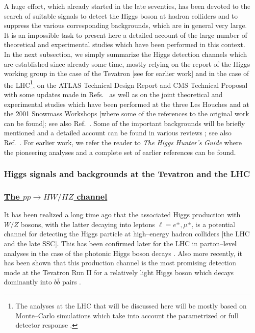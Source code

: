A huge effort, which already started in the late seventies, has been devoted to
the search of suitable signals to detect the Higgs boson at hadron colliders
and to suppress the various corresponding backgrounds, which are in general
very large. It is an impossible task to present here a detailed account of the
large number of theoretical and experimental studies which have been performed
in this context. In the next subsection, we simply summarize the Higgs
detection channels which are established since already some time, mostly
relying on the report of the Higgs working group in the case of the Tevatron
\cite{Higgs-TeV} [see \cite{pp-HV-expT} for earlier work] and in the case of
the LHC\footnote{The analyses at the LHC that will be discussed here will be
mostly based on Monte--Carlo \cite{PYTHIA,HERWIG} simulations which take into
account the parametrized \cite{ATLASFAST,CMSJET} or full detector response
\cite{ATLAS-TDR,CMS-TDR-True}.},
on the ATLAS Technical Design Report \cite{ATLAS-TDR} and CMS Technical
Proposal \cite{CMS-TDR} with some updates made in
Refs.~\cite{ATLAS-review,CMS-review,ATLAS+CMS} as well as on the joint
theoretical and experimental studies which have been performed at the three Les
Houches \cite{Houches1999,Houches2001,Houches2003} and at the 2001 Snowmass
\cite{Snowmass2001} Workshops [where some of the references to the original
work can be found]; see also Ref.~\cite{Karl-new}. Some of the important
backgrounds will be briefly mentioned and a detailed account can be found in
various reviews \cite{Top-LHC,EW-LHC,QCD-LHC,Houches-QCD}; see also
Ref.~\cite{Zepp-HC01}. For earlier work, we refer the reader to  {\it The Higgs
Hunter's Guide} where the pioneering analyses and a complete set of earlier
references can be found.  

\vspace*{-3mm}
\subsubsection{Higgs signals and backgrounds at the Tevatron and the LHC}

\vspace*{-1mm}
\subsubsection*{\underline{The $pp \to HW/HZ$ channel}}

It has been realized a long time ago \cite{pp-Galison,pp-EHLQ} that the
associated Higgs production with $W/Z$ bosons, with the latter decaying into
leptons $\ell = e^\pm, \mu^\pm$, is a potential channel for detecting the Higgs
particle at high--energy hadron colliders [the LHC and the late SSC]. This has 
been confirmed later for the LHC  in parton--level analyses in the case of the
photonic Higgs boson decays \cite{pp-HW-laa0,pp-HW-laa1}. Also more recently,
it has been shown that this production channel  is the most promising detection
mode at the Tevatron Run II for a relatively light Higgs boson which decays
dominantly into $b\bar b$ pairs \cite{pp-HW-bb-TeV,Gunion-Han}.\s 

